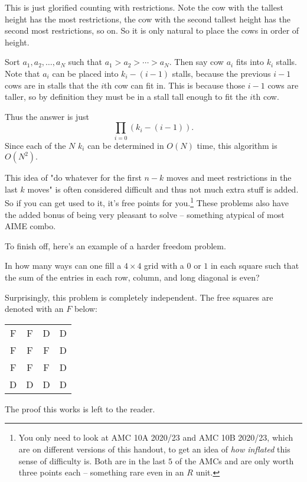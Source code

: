 \documentclass[blue,onecol]{shooting}
\begin{document}
\begin{sol}
This is just glorified counting with restrictions. Note the cow with the tallest height has the most restrictions, the cow with the second tallest height has the second most restrictions, so on. So it is only natural to place the cows in order of height.

Sort $a_1,a_2,\ldots,a_N$ such that $a_1>a_2>\cdots>a_N.$ Then say cow $a_i$ fits into $k_i$ stalls. Note that $a_i$ can be placed into $k_i-(i-1)$ stalls, because the previous $i-1$ cows are in stalls that the $i$th cow can fit in. This is because those $i-1$ cows are taller, so by definition they must be in a stall tall enough to fit the $i$th cow.

Thus the answer is just
\[\prod_{i=0}(k_i-(i-1)).\]
Since each of the $N$ $k_i$ can be determined in $O(N)$ time, this algorithm is $O(N^2).$
\end{sol}

This idea of "do whatever for the first $n-k$ moves and meet restrictions in the last $k$ moves" is often considered difficult and thus not much extra stuff is added. So if you can get used to it, it's free points for you.\footnote{You only need to look at AMC 10A 2020/23 and AMC 10B 2020/23, which are on different versions of this handout, to get an idea of \textit{how inflated} this sense of difficulty is. Both are in the last $5$ of the AMCs and are only worth three points each -- something rare even in an $R$ unit.} These problems also have the added bonus of being very pleasant to solve -- something atypical of most AIME combo.

To finish off, here's an example of a harder freedom problem.

\begin{exam}
In how many ways can one fill a $4\times 4$ grid with a $0$ or $1$ in each square such that the sum of the entries in each row, column, and long diagonal is even?
\end{exam}

\begin{sol}
Surprisingly, this problem is completely independent. The free squares are denoted with an $F$ below:

\begin{tabular}{c c c c}
F & F & D & D \\
F & F & F & D \\
F & F & F & D \\
D & D & D & D
\end{tabular}

The proof this works is left to the reader.
\end{sol}
\end{document}
